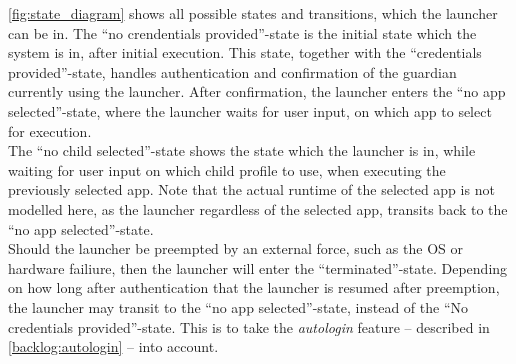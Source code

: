\autoref{fig:state_diagram} shows all possible states and transitions, which the launcher can be in.
The ``no crendentials provided''-state is the initial state which the system is in, after initial execution.
This state, together with the ``credentials provided''-state, handles authentication and confirmation of the guardian currently using the launcher.
After confirmation, the launcher enters the ``no app selected''-state, where the launcher waits for user input, on which app to select for execution. \\

The ``no child selected''-state shows the state which the launcher is in, while waiting for user input on which child profile to use, when executing the previously selected app.
Note that the actual runtime of the selected app is not modelled here, as the launcher regardless of the selected app, transits back to the ``no app selected''-state. \\

Should the launcher be preempted by an external force, such as the OS or hardware failiure, then the launcher will enter the ``terminated''-state.
Depending on how long after authentication that the launcher is resumed after preemption, the launcher may transit to the ``no app selected''-state, instead of the ``No credentials provided''-state.
This is to take the \emph{autologin} feature -- described in \autoref{backlog:autologin} -- into account.
